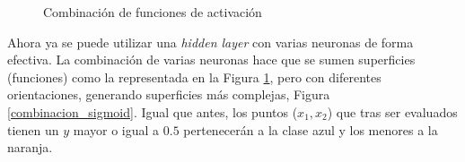 \begin{itemize}
    \vspace*{5pt}
    \begin{figure}[h!]
        \centering
            \qquad
        \caption{Combinación de funciones de activación}
        \label{single_sigmoid}
    \end{figure}
    
    Ahora ya se puede utilizar una \textit{hidden layer} con varias neuronas de forma efectiva. La combinación de varias neuronas hace que se sumen superficies (funciones) como la representada en la Figura \ref{single_sigmoid}, pero con diferentes orientaciones, generando superficies más complejas, Figura \ref{combinacion_sigmoid}. Igual que antes, los puntos ($x_1,x_2$) que tras ser evaluados tienen un $y$ mayor o igual a $0.5$ pertenecerán a la clase azul y los menores a la naranja.
    

\end{itemize}
